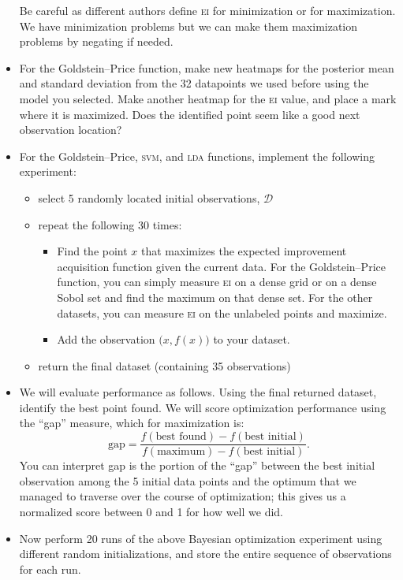 \documentclass{article}
\newcommand{\acro}[1]{\textsc{\MakeLowercase{#1}}}
\newcommand{\mc}[1]{\mathcal{#1}}
\newcommand{\data}{\mc{D}}
\begin{document}
\begin{itemize}
  Be careful as different authors define \acro{EI} for minimization or for
  maximization. We have minimization problems but we can make them maximization
  problems by negating if needed.
\item
  For the Goldstein--Price function, make new heatmaps for the posterior mean
  and standard deviation from the 32 datapoints we used before using the model
  you selected.  Make another heatmap for the \acro{EI} value, and place a mark
  where it is maximized. Does the identified point seem like a good next
  observation location?
\item
  For the Goldstein--Price, \acro{SVM}, and \acro{LDA} functions, implement the
  following experiment:
  \begin{itemize}
  \item
    select 5 randomly located initial observations, $\data$
  \item
    repeat the following 30 times:
    \begin{itemize}
    \item
      Find the point $x$ that maximizes the expected improvement acquisition
      function given the current data. For the Goldstein--Price function, you
      can simply measure \acro{EI} on a dense grid or on a dense Sobol set and
      find the maximum on that dense set.  For the other datasets, you can
      measure \acro{EI} on the unlabeled points and maximize.
    \item
      Add the observation $\bigl(x, f(x)\bigr)$ to your dataset.
    \end{itemize}
  \item
    return the final dataset (containing 35 observations)
  \end{itemize}
\item
  We will evaluate performance as follows. Using the final returned dataset,
  identify the best point found. We will score optimization performance using
  the ``gap'' measure, which for maximization is:
  \[
  \text{gap} = \frac{f(\text{best found}) - f(\text{best initial})}{f(\text{maximum}) - f(\text{best initial})}.
  \]
  You can interpret gap is the portion of the ``gap'' between the best initial
  observation among the 5 initial data points and the optimum that we managed to
  traverse over the course of optimization; this gives us a normalized score
  between 0 and 1 for how well we did.
\item
  Now perform 20 runs of the above Bayesian optimization experiment using
  different random initializations, and store the entire sequence of
  observations for each run.


\end{itemize}
\end{document}
